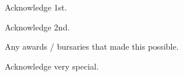 Acknowledge 1st. \newline

Acknowledge 2nd. \newline

Any awards / bursaries that made this possible. \newline

Acknowledge very special.

